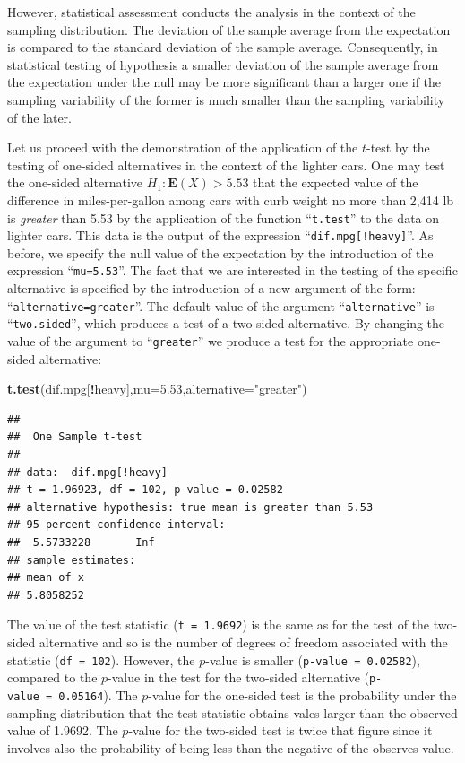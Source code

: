 \documentclass[]{krantz}
\makeatletter
\newenvironment{Shaded}{\begin{snugshade}}{\end{snugshade}}
\newcommand{\DataTypeTok}[1]{\textcolor[rgb]{0.13,0.29,0.53}{#1}}
\newcommand{\FloatTok}[1]{\textcolor[rgb]{0.00,0.00,0.81}{#1}}
\newcommand{\KeywordTok}[1]{\textcolor[rgb]{0.13,0.29,0.53}{\textbf{#1}}}
\newcommand{\NormalTok}[1]{#1}
\newcommand{\OperatorTok}[1]{\textcolor[rgb]{0.81,0.36,0.00}{\textbf{#1}}}
\newcommand{\StringTok}[1]{\textcolor[rgb]{0.31,0.60,0.02}{#1}}
\newcommand{\Expec}{\mathbf{E}}
\newenvironment{kframe}{%
\medskip{}
\setlength{\fboxsep}{.8em}
 \def\at@end@of@kframe{}%
 \ifinner\ifhmode%
  \def\at@end@of@kframe{\end{minipage}}%
  \begin{minipage}{\columnwidth}%
 \fi\fi%
 \def\FrameCommand##1{\hskip\@totalleftmargin \hskip-\fboxsep
 \colorbox{shadecolor}{##1}\hskip-\fboxsep
     \hskip-\linewidth \hskip-\@totalleftmargin \hskip\columnwidth}%
 \MakeFramed {\advance\hsize-\width
   \@totalleftmargin\z@ \linewidth\hsize
   \@setminipage}}%
 {\par\unskip\endMakeFramed%
 \at@end@of@kframe}
\renewenvironment{Shaded}{\begin{kframe}}{\end{kframe}}
\theoremstyle{definition}
\theoremstyle{definition}
\theoremstyle{definition}
\theoremstyle{remark}
\makeatother
\begin{document}
However, statistical assessment conducts the analysis in the context of
the sampling distribution. The deviation of the sample average from the
expectation is compared to the standard deviation of the sample average.
Consequently, in statistical testing of hypothesis a smaller deviation
of the sample average from the expectation under the null may be more
significant than a larger one if the sampling variability of the former
is much smaller than the sampling variability of the later.

Let us proceed with the demonstration of the application of the \(t\)-test
by the testing of one-sided alternatives in the context of the lighter
cars. One may test the one-sided alternative \(H_1:\Expec(X) > 5.53\) that
the expected value of the difference in miles-per-gallon among cars with
curb weight no more than 2,414 lb is \emph{greater} than 5.53 by the
application of the function ``\texttt{t.test}'' to the data on lighter cars. This
data is the output of the expression ``\texttt{dif.mpg{[}!heavy{]}}''. As before, we
specify the null value of the expectation by the introduction of the
expression ``\texttt{mu=5.53}''. The fact that we are interested in the testing
of the specific alternative is specified by the introduction of a new
argument of the form: ``\texttt{alternative=greater}''. The default value of the
argument ``\texttt{alternative}'' is ``\texttt{two.sided}'', which produces a test of a
two-sided alternative. By changing the value of the argument to
``\texttt{greater}'' we produce a test for the appropriate one-sided alternative:

\begin{Shaded}
\begin{Highlighting}[]
\KeywordTok{t.test}\NormalTok{(dif.mpg[}\OperatorTok{!}\NormalTok{heavy],}\DataTypeTok{mu=}\FloatTok{5.53}\NormalTok{,}\DataTypeTok{alternative=}\StringTok{"greater"}\NormalTok{)}
\end{Highlighting}
\end{Shaded}

\begin{verbatim}
## 
##  One Sample t-test
## 
## data:  dif.mpg[!heavy]
## t = 1.96923, df = 102, p-value = 0.02582
## alternative hypothesis: true mean is greater than 5.53
## 95 percent confidence interval:
##  5.5733228       Inf
## sample estimates:
## mean of x 
## 5.8058252
\end{verbatim}

The value of the test statistic (\texttt{t\ =\ 1.9692}) is the same as for the
test of the two-sided alternative and so is the number of degrees of
freedom associated with the statistic (\texttt{df\ =\ 102}). However, the
\(p\)-value is smaller (\texttt{p-value\ =\ 0.02582}), compared to the \(p\)-value in
the test for the two-sided alternative (\texttt{p-value\ =\ 0.05164}). The
\(p\)-value for the one-sided test is the probability under the sampling
distribution that the test statistic obtains vales larger than the
observed value of 1.9692. The \(p\)-value for the two-sided test is twice
that figure since it involves also the probability of being less than
the negative of the observes value.
\end{document}
